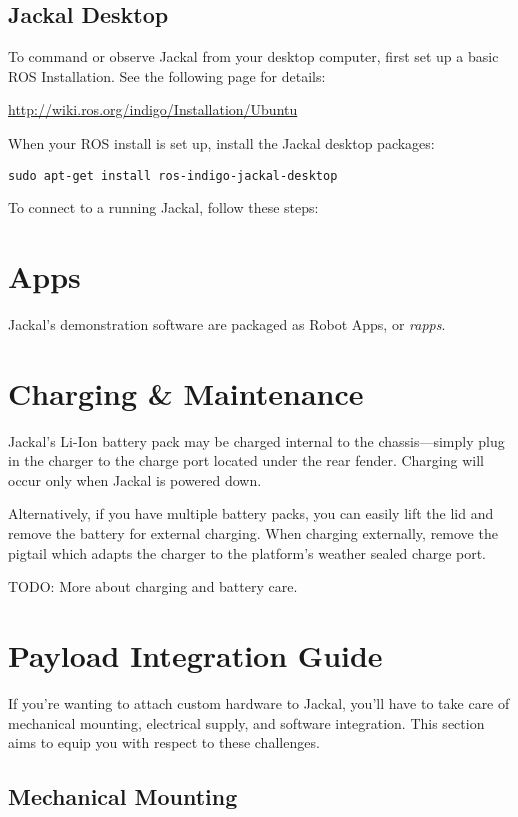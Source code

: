 \documentclass[]{clearpath-manual}
\begin{document}
\subsection{Jackal Desktop}

To command or observe Jackal from your desktop computer, first set up a basic
ROS Installation. See the following page for details:

\url{http://wiki.ros.org/indigo/Installation/Ubuntu}

When your ROS install is set up, install the Jackal desktop packages:

\begin{lstlisting}
sudo apt-get install ros-indigo-jackal-desktop
\end{lstlisting}

To connect to a running Jackal, follow these steps:


\section{Apps}

Jackal's demonstration software are packaged as Robot Apps, or \textit{rapps}.


\section{Charging \& Maintenance}

Jackal's Li-Ion battery pack may be charged internal to the chassis---simply plug in
the charger to the charge port located under the rear fender. Charging will occur
only when Jackal is powered down.

Alternatively, if you have multiple battery packs, you can easily lift the lid and
remove the battery for external charging. When charging externally, remove the pigtail
which adapts the charger to the platform's weather sealed charge port.

TODO: More about charging and battery care.


\section{Payload Integration Guide}

If you're wanting to attach custom hardware to Jackal, you'll have to take care of
mechanical mounting, electrical supply, and software integration. This section
aims to equip you with respect to these challenges.

\subsection{Mechanical Mounting}
\end{document}

